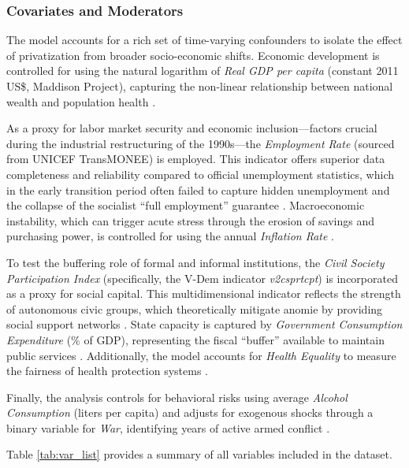 \documentclass[en,magisterska]{pracamgr}
\begin{document}
\subsubsection*{Covariates and Moderators}
The model accounts for a rich set of time-varying confounders to isolate the effect of privatization from broader socio-economic shifts. 
Economic development is controlled for using the natural logarithm of \textit{Real GDP per capita} (constant 2011 US\$, Maddison Project), 
capturing the non-linear relationship between national wealth and population health \citep{Hamm2012, Stuckler2009}.

As a proxy for labor market security and economic inclusion—factors crucial during the industrial restructuring of the 1990s—the 
\textit{Employment Rate} (sourced from UNICEF TransMONEE) is employed. This indicator offers superior data completeness and reliability 
compared to official unemployment statistics, which in the early transition period often failed to capture hidden unemployment and the 
collapse of the socialist ``full employment'' guarantee \citep{Cornia2016, UNECE2004}. Macroeconomic instability, which can trigger acute 
stress through the erosion of savings and purchasing power, is controlled for using the annual \textit{Inflation Rate} \citep{B_Brainerd1998, 
Treisman2010}.

To test the buffering role of formal and informal institutions, the \textit{Civil Society Participation Index} (specifically, the V-Dem indicator \textit{v2csprtcpt}) 
is incorporated as a proxy for social capital. This multidimensional indicator reflects the strength of autonomous civic groups, which theoretically 
mitigate anomie by providing social support networks \citep{Stuckler2009, Scheiring2018}. State capacity is captured by \textit{Government Consumption 
Expenditure} (\% of GDP), representing the fiscal ``buffer'' available to maintain public services \citep{Hamm2012, Cieslik2018}. Additionally, the model 
accounts for \textit{Health Equality} to measure the fairness of health protection systems 
\citep{Cornia2016}.

Finally, the analysis controls for behavioral risks using average \textit{Alcohol Consumption} (liters per capita) and adjusts for exogenous shocks 
through a binary variable for \textit{War}, identifying years of active armed conflict \citep{Stuckler2009, Bhattacharya2013}.


Table \ref{tab:var_list} provides a summary of all variables included in the dataset.
\end{document}

